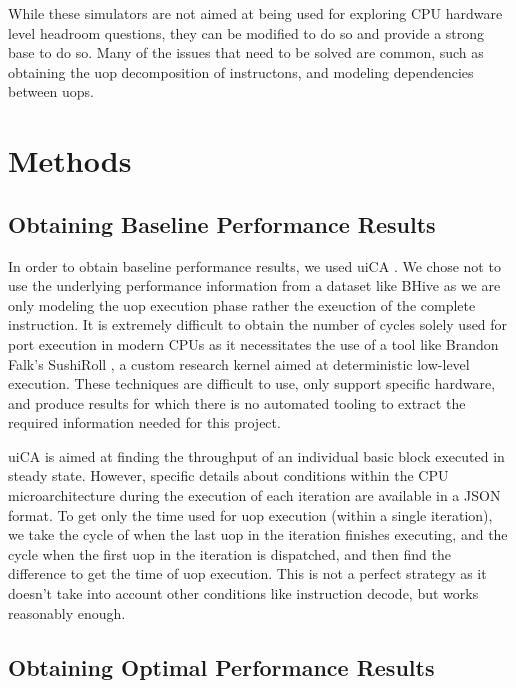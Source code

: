 \documentclass[sigconf]{acmart}
\begin{document}
While these simulators are not aimed at being used for exploring CPU hardware level headroom questions, they can
be modified to do so and provide a strong base to do so. Many of the issues that need to be solved are common,
such as obtaining the uop decomposition of instructons, and modeling dependencies between uops.

\section{Methods}

\subsection{Obtaining Baseline Performance Results}

In order to obtain baseline performance results, we used uiCA \cite{abel2022uica}. We chose not to use the
underlying performance information from a dataset like BHive as we are only modeling the uop execution
phase rather the exeuction of the complete instruction. It is extremely difficult to obtain the number of cycles
solely used for port execution in modern CPUs as it necessitates the use of a tool like Brandon Falk's SushiRoll
\cite{falk2019sushiroll}, a custom research kernel aimed at deterministic low-level execution. These techniques are
difficult to use, only support specific hardware, and produce results for which there is no automated tooling
to extract the required information needed for this project.

uiCA is aimed at finding the throughput of an individual basic block executed in steady state. However,
specific details about conditions within the CPU microarchitecture during the execution of each iteration are
available in a JSON format. To get only the time used for uop execution (within a single iteration), we
take the cycle of when the last uop in the iteration finishes executing, and the cycle when the first uop in
the iteration is dispatched, and then find the difference to get the time of uop execution. This is not a perfect
strategy as it doesn't take into account other conditions like instruction decode, but works reasonably enough.


\subsection{Obtaining Optimal Performance Results}
\end{document}
